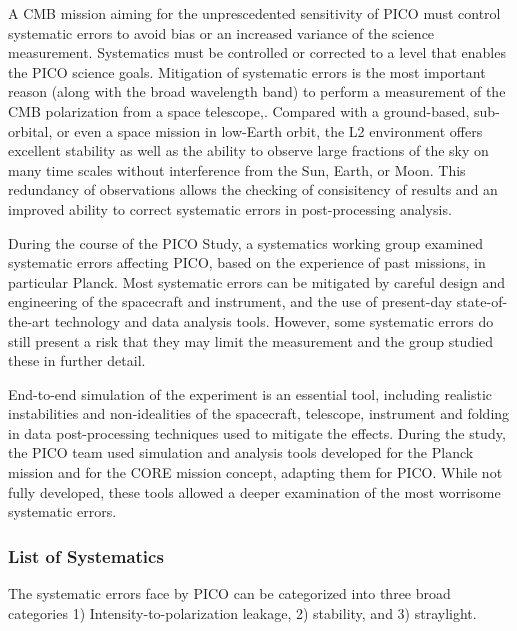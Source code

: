 \documentclass[PICOReport.tex]{subfiles}
\begin{document}
A CMB mission aiming for the unprescedented sensitivity of PICO must control
systematic errors to avoid bias or an increased variance of the
science measurement.   
Systematics must be controlled or corrected to a level that enables the PICO
science goals.
Mitigation of systematic errors is the most important reason (along with the broad
wavelength band) to perform a measurement of the CMB polarization from a space telescope,.
Compared with a ground-based, sub-orbital, or even a space mission in
low-Earth orbit, the L2 environment offers excellent stability as well
as the ability to observe large fractions of the sky on many time
scales without interference from the Sun, Earth, or Moon.
This redundancy of observations allows the checking of consisitency of
results and an improved ability to correct systematic errors in
post-processing analysis.

During the course of the PICO Study, a systematics working group
examined systematic errors affecting PICO, based on the experience of 
past missions, in particular Planck.  
Most  systematic errors can be mitigated by careful design and engineering of 
the spacecraft and instrument, and the use of present-day state-of-the-art
technology and data analysis tools.   
However, some systematic errors do still present a risk that they may
limit the measurement and the group studied these in further detail.

End-to-end simulation of the experiment is an essential tool,
including realistic instabilities and non-idealities of the spacecraft,
telescope, instrument and folding in data post-processing techniques
used to mitigate the effects.  During the study, the PICO team used 
simulation and analysis tools developed for the Planck mission\cite{plank2015_xii_focalplane} and for
the CORE mission concept, adapting them for PICO.  While not fully
developed, these tools allowed a deeper examination of the most
worrisome systematic errors.

\subsubsection{List of Systematics}
The systematic errors face by PICO can be categorized into three broad categories 
1) Intensity-to-polarization leakage, 2) stability, and 3)
straylight.  
\end{document}

